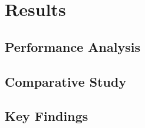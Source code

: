 \section{Results}
\label{sec:results}


\subsection{Performance Analysis}

\subsection{Comparative Study}

\subsection{Key Findings}
